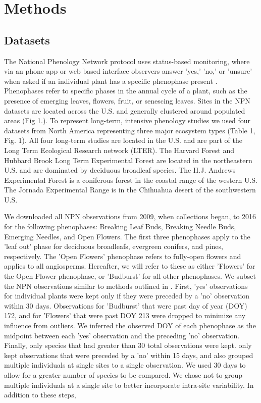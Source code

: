 \documentclass[fleqn,12pt,lineno]{wlpeerj} %
\begin{document}
\section*{Methods}

\subsection*{Datasets}

The National Phenology Network protocol uses status-based monitoring, where via an phone app or web based interface observers answer 'yes,' 'no,' or 'unsure' when asked if an individual plant has a specific phenophase present \citep{denny2014}. Phenophases refer to specific phases in the annual cycle of a plant, such as the presence of emerging leaves, flowers, fruit, or senescing leaves. Sites in the NPN datasets are located across the U.S. and generally clustered around populated areas (Fig 1.). To represent long-term, intensive phenology studies we used four datasets from North America representing three major ecosystem types (Table 1, Fig. 1). All four long-term studies are located in the U.S. and are part of the Long Term Ecological Research network (LTER). The Harvard Forest and Hubbard Brook Long Term Experimental Forest are located in the northeastern U.S. and are dominated by deciduous broadleaf species. The H.J. Andrews Experimental Forest is a coniferous forest in the coastal range of the western U.S. The Jornada Experimental Range is in the Chihuahua desert of the southwestern U.S. 

We downloaded all NPN observations from 2009, when collections began, to 2016 for the following phenophases: Breaking Leaf Buds, Breaking Needle Buds, Emerging Needles, and Open Flowers. The first three phenophases apply to the 'leaf out' phase for deciduous broadleafs, evergreen conifers, and pines, respectively. The 'Open Flowers' phenophase refers to fully-open flowers and applies to all angiosperms. Hereafter, we will refer to these as either 'Flowers' for the Open Flower phenophase, or 'Budburst' for all other phenophases. We subset the NPN observations similar to methods outlined in \cite{crimmins2017}. First, 'yes' observations for individual plants were kept only if they were preceded by a 'no' observation within 30 days. Observations for 'Budburst' that were past day of year (DOY) 172, and for 'Flowers' that were past DOY 213 were dropped to minimize any influence from outliers. We inferred the observed DOY of each phenophase as the midpoint between each 'yes' observation and the preceding 'no' observation. Finally, only species that had greater than 30 total observations were kept. \cite{crimmins2017} only kept observations that were preceded by a 'no' within 15 days, and also grouped multiple individuals at single sites to a single observation. We used 30 days to allow for a greater number of species to be compared. We chose not to group multiple individuals at a single site to better incorporate intra-site variability. In addition to these steps,  
\end{document}
